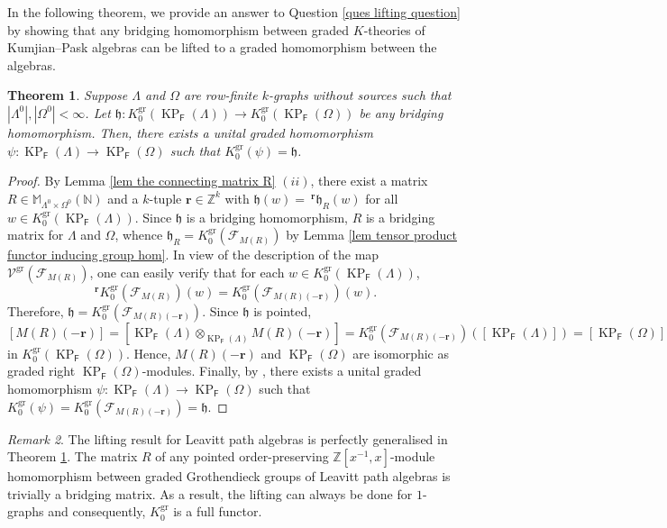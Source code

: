 \documentclass[12pt]{amsart}
\newcommand{\KP}{\operatorname{KP}}
\newtheorem{thm}{Theorem}[section]
\theoremstyle{definition}
\theoremstyle{remark}
\newtheorem{rmk}[thm]{Remark}
\newcommand{\gr}{\operatorname{gr}}
\begin{document}
In the following theorem, we provide an answer to Question \ref{ques lifting question} by showing that any bridging homomorphism between graded $K$-theories of Kumjian--Pask algebras can be lifted to a graded homomorphism between the algebras. 
\begin{thm}\label{the lifting theorem}
Suppose $\Lambda$ and $\Omega$ are row-finite $k$-graphs without sources such that $|\Lambda^0|,|\Omega^0|< \infty$. Let $\mathfrak{h}:K_0^{\gr}(\KP_\mathsf{F}(\Lambda))\longrightarrow K_0^{\gr}(\KP_\mathsf{F}(\Omega))$ be any bridging homomorphism. Then, there exists a unital graded homomorphism $\psi:\KP_\mathsf{F}(\Lambda)\longrightarrow \KP_\mathsf{F}(\Omega)$ such that $K_0^{\gr}(\psi)=\mathfrak{h}$.    
\end{thm}
\begin{proof}
By Lemma \ref{lem the connecting matrix R} $(ii)$, there exist a matrix $R\in \mathbb{M}_{\Lambda^0\times \Omega^0}(\mathbb{N})$ and a $k$-tuple $\mathbf{r}\in \mathbb{Z}^k$ with $\mathfrak{h}(w)=~^{\mathbf{r}}\mathfrak{h}_R(w)$ for all $w\in K_0^{\gr}(\KP_\mathsf{F}(\Lambda))$. Since $\mathfrak{h}$ is a bridging homomorphism, $R$ is a bridging matrix for $\Lambda$ and $\Omega$, whence $\mathfrak{h}_R=K_0^{\gr}(\mathcal{F}_{M(R)})$ by Lemma \ref{lem tensor product functor inducing group hom}. In view of the description of the map $\mathcal{V}^{\gr}(\mathcal{F}_{M(R)})$, one can easily verify that for each $w\in K_0^{\gr}(\KP_\mathsf{F}(\Lambda))$, \[~^{\mathbf{r}}K_0^{\gr}(\mathcal{F}_{M(R)})(w)=K_0^{\gr}(\mathcal{F}_{M(R)(-\mathbf{r})})(w).\] Therefore, $\mathfrak{h}=K_0^{\gr}(\mathcal{F}_{M(R)(-\mathbf{r})})$. Since $\mathfrak{h}$ is pointed, \[[M(R)(-\mathbf{r})]=[\KP_\mathsf{F}(\Lambda)\otimes_{\KP_\mathsf{F}(\Lambda)}M(R)(-\mathbf{r})]=K_0^{\gr}(\mathcal{F}_{M(R)(-\mathbf{r})})([\KP_\mathsf{F}(\Lambda)])=[\KP_\mathsf{F}(\Omega)]\] in $K_0^{\gr}(\KP_\mathsf{F}(\Omega))$. Hence, $M(R)(-\mathbf{r})$ and $\KP_\mathsf{F}(\Omega)$ are isomorphic as graded right $\KP_\mathsf{F}(\Omega)$-modules. Finally, by \cite[Proposition 3.1]{Brix}, there exists a unital graded homomorphism $\psi:\KP_\mathsf{F}(\Lambda)\longrightarrow \KP_\mathsf{F}(\Omega)$ such that $K_0^{\gr}(\psi)=K_0^{\gr}(\mathcal{F}_{M(R)(-\mathbf{r})})=\mathfrak{h}$.
\end{proof}

\begin{rmk}\label{rem the generality of bridging criterion}
The lifting result for Leavitt path algebras is perfectly generalised in Theorem \ref{the lifting theorem}. The matrix $R$ of any pointed order-preserving $\mathbb{Z}[x^{-1},x]$-module homomorphism between graded Grothendieck groups of Leavitt path algebras is trivially a bridging matrix. As a result, the lifting can always be done for $1$-graphs and consequently, $K_0^{\gr}$ is a full functor.    
\end{rmk}
\end{document}
